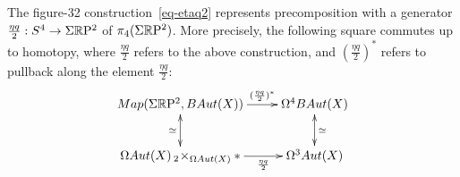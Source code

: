 \documentclass{amsart}
\begin{document}
\begin{lemma} \label{lemma-etaq2}
The figure-32 construction~\eqref{eq-etaq2} represents precomposition with a generator $\frac{\eta q}{2}: S^4 \rightarrow \Sigma \mathbb R \mathrm{P}^2$ of $\pi_4(\Sigma \mathbb R \mathrm{P}^2)$.  More precisely, the following square commutes up to homotopy, where $\frac{\eta q}{2}$ refers to the above construction, and $(\frac{\eta q}{2})^\ast$ refers to pullback along the element $\frac{\eta q}{2}$:
\begin{equation} \nn
\xymatrix{
\Map(\Sigma \RP^2,B\Aut(X)) \ar[r]^-{(\frac{\eta q}{2})^\ast} \ar@{<->}[d]_{\simeq} & \Omega^4 B\Aut(X)  \ar@{<->}[d]^{\simeq} \\
\Omega\Aut(X) \,_2\! \times_{\Omega \Aut(X)} \ast \ar[r]_-{\frac{\eta q}{2}} & \Omega^3 \Aut(X)
}
\end{equation}
\end{lemma}
\end{document}
